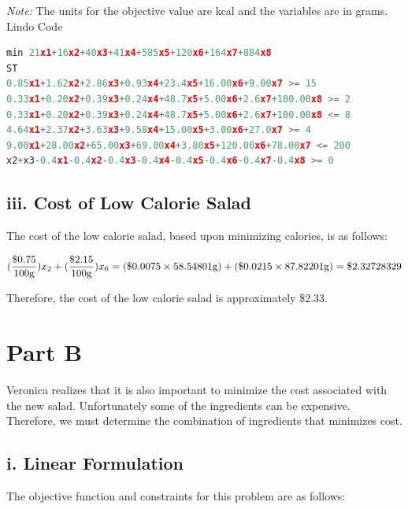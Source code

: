 \documentclass[11pt]{scrreprt}
\begin{document}
{\it Note:} The units for the objective value are kcal and the variables are in grams.\\

Lindo Code
\begin{lstlisting}[basicstyle=\small,language=c]
min 21x1+16x2+40x3+41x4+585x5+120x6+164x7+884x8
ST
0.85x1+1.62x2+2.86x3+0.93x4+23.4x5+16.00x6+9.00x7 >= 15
0.33x1+0.20x2+0.39x3+0.24x4+48.7x5+5.00x6+2.6x7+100.00x8 >= 2
0.33x1+0.20x2+0.39x3+0.24x4+48.7x5+5.00x6+2.6x7+100.00x8 <= 8
4.64x1+2.37x2+3.63x3+9.58x4+15.00x5+3.00x6+27.0x7 >= 4
9.00x1+28.00x2+65.00x3+69.00x4+3.80x5+120.00x6+78.00x7 <= 200
x2+x3-0.4x1-0.4x2-0.4x3-0.4x4-0.4x5-0.4x6-0.4x7-0.4x8 >= 0
\end{lstlisting}

\subsection{iii. Cost of Low Calorie Salad}
The cost of the low calorie salad, based upon minimizing calories, is as follows:

\begin{displaymath}
({\$0.75 \over 100\text{g}})x_2 + ({\$2.15 \over 100\text{g}})x_6 = (\$0.0075 \times 58.54801\text{g}) + (\$0.0215 \times 87.82201\text{g}) = \$2.32728329
\end{displaymath}

Therefore, the cost of the low calorie salad is approximately \$2.33.

\section{Part B}
Veronica realizes that it is also important to minimize the cost associated with the new salad. Unfortunately some of the ingredients can be expensive. Therefore, we must determine the combination of ingredients that minimizes cost.

\subsection{i. Linear Formulation}
The objective function and constraints for this problem are as 
follows:
\end{document}
